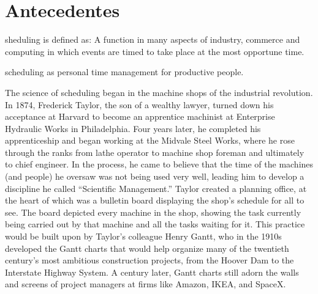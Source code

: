 \section{Antecedentes}

%
%
%
%
%
%
%



sheduling is defined as:  A function in many aspects of industry, commerce and computing in which events are timed to take place at the most opportune time. 

scheduling as personal time management for productive people.

The science of scheduling began in the machine shops of the industrial revolution. In 1874, Frederick Taylor, the son of a wealthy lawyer, turned down his acceptance at Harvard to become an apprentice machinist at Enterprise Hydraulic Works in Philadelphia. Four years later, he completed his apprenticeship and began working at the Midvale Steel Works, where he rose through the ranks from lathe operator to machine shop foreman and ultimately to chief engineer. In the process, he came to believe that the time of the machines (and people) he oversaw was not being used very well, leading him to develop a discipline he called “Scientific Management.”
Taylor created a planning office, at the heart of which was a bulletin board displaying the shop’s schedule for all to see. The board depicted every machine in the shop, showing the task currently being carried out by that machine and all the tasks waiting for it. This practice would be built upon by Taylor’s colleague Henry Gantt, who in the 1910s developed the Gantt charts that would help organize many of the twentieth century’s most ambitious construction projects, from the Hoover Dam to the Interstate Highway System. A century later, Gantt charts still adorn the walls and screens of project managers at firms like Amazon, IKEA, and SpaceX.

